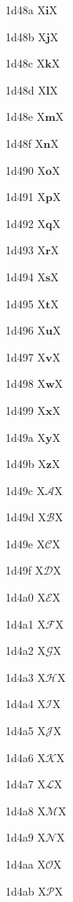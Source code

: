 \documentclass[11pt]{article}
\begin{document}
1d48a X{\ensuremath{\boldsymbol{i}}}X

1d48b X{\ensuremath{\boldsymbol{j}}}X

1d48c X{\ensuremath{\boldsymbol{k}}}X

1d48d X{\ensuremath{\boldsymbol{l}}}X

1d48e X{\ensuremath{\boldsymbol{m}}}X

1d48f X{\ensuremath{\boldsymbol{n}}}X

1d490 X{\ensuremath{\boldsymbol{o}}}X

1d491 X{\ensuremath{\boldsymbol{p}}}X

1d492 X{\ensuremath{\boldsymbol{q}}}X

1d493 X{\ensuremath{\boldsymbol{r}}}X

1d494 X{\ensuremath{\boldsymbol{s}}}X

1d495 X{\ensuremath{\boldsymbol{t}}}X

1d496 X{\ensuremath{\boldsymbol{u}}}X

1d497 X{\ensuremath{\boldsymbol{v}}}X

1d498 X{\ensuremath{\boldsymbol{w}}}X

1d499 X{\ensuremath{\boldsymbol{x}}}X

1d49a X{\ensuremath{\boldsymbol{y}}}X

1d49b X{\ensuremath{\boldsymbol{z}}}X

1d49c X{\ensuremath{\mathscr{A}}}X

1d49d X{\ensuremath{\mathscr{B}}}X

1d49e X{\ensuremath{\mathscr{C}}}X

1d49f X{\ensuremath{\mathscr{D}}}X

1d4a0 X{\ensuremath{\mathscr{E}}}X

1d4a1 X{\ensuremath{\mathscr{F}}}X

1d4a2 X{\ensuremath{\mathscr{G}}}X

1d4a3 X{\ensuremath{\mathscr{H}}}X

1d4a4 X{\ensuremath{\mathscr{I}}}X

1d4a5 X{\ensuremath{\mathscr{J}}}X

1d4a6 X{\ensuremath{\mathscr{K}}}X

1d4a7 X{\ensuremath{\mathscr{L}}}X

1d4a8 X{\ensuremath{\mathscr{M}}}X

1d4a9 X{\ensuremath{\mathscr{N}}}X

1d4aa X{\ensuremath{\mathscr{O}}}X

1d4ab X{\ensuremath{\mathscr{P}}}X
\end{document}

